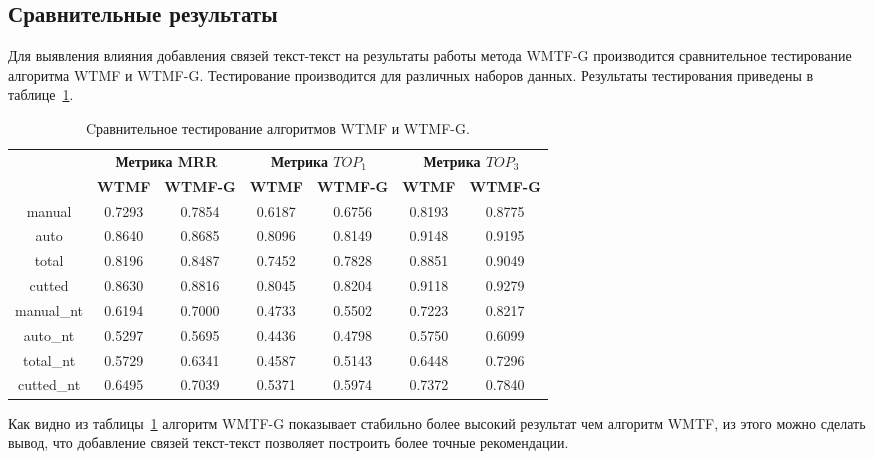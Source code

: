 \subsection{Сравнительные результаты}
    Для выявления влияния добавления связей текст-текст на результаты работы метода WMTF-G производится сравнительное тестирование алгоритма WTMF и WTMF-G. Тестирование производится для различных наборов данных.
    Результаты тестирования приведены в таблице~\ref{tabular:wtmf_wmtfg}.

    \begin{table}[h!]
    \caption{Cравнительное тестирование алгоритмов WTMF и WTMF-G. \bigskip}
    \centering

    \label{tabular:wtmf_wmtfg}
        \begin{tabular}{|c|c|c|c|c|c|c|}
            \hline
            \bf{\multirow{2}{*}{\specialcell{Набор данных}}} &
            \multicolumn{2}{|c|}{\bf{Метрика MRR}} &
            \multicolumn{2}{|c|}{\bf{Метрика $TOP_1$}} &
            \multicolumn{2}{|c|}{\bf{Метрика $TOP_3$}} \\ \cline{2-7}
            & \bf{WTMF} & \bf{WTMF-G} & \bf{WTMF} & \bf{WTMF-G} & \bf{WTMF} & \bf{WTMF-G} \\ \hline
            manual     & 0.7293 & 0.7854 & 0.6187 & 0.6756 & 0.8193 & 0.8775 \\ \hline
            auto       & 0.8640 & 0.8685 & 0.8096 & 0.8149 & 0.9148 & 0.9195 \\ \hline
            total      & 0.8196 & 0.8487 & 0.7452 & 0.7828 & 0.8851 & 0.9049 \\ \hline
            cutted     & 0.8630 & 0.8816 & 0.8045 & 0.8204 & 0.9118 & 0.9279 \\ \hline
            manual\_nt & 0.6194 & 0.7000 & 0.4733 & 0.5502 & 0.7223 & 0.8217 \\ \hline
            auto\_nt   & 0.5297 & 0.5695 & 0.4436 & 0.4798 & 0.5750 & 0.6099 \\ \hline
            total\_nt  & 0.5729 & 0.6341 & 0.4587 & 0.5143 & 0.6448 & 0.7296 \\ \hline
            cutted\_nt & 0.6495 & 0.7039 & 0.5371 & 0.5974 & 0.7372 & 0.7840 \\ \hline
        \end{tabular}
    \end{table}

    Как видно из таблицы~\ref{tabular:wtmf_wmtfg} алгоритм WMTF-G показывает стабильно более высокий результат чем алгоритм WMTF,
    из этого можно сделать вывод, что добавление связей текст-текст позволяет построить более точные рекомендации.

